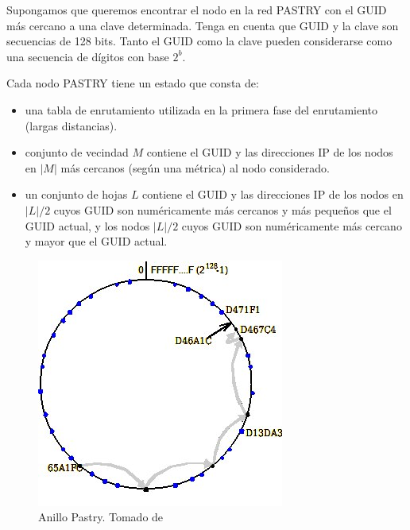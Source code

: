  Supongamos que queremos encontrar el nodo en la red PASTRY con el GUID más cercano a una clave determinada. Tenga en cuenta que GUID y la clave son secuencias de 128 bits. Tanto el GUID como la clave pueden considerarse como una secuencia de dígitos con base $2^{b}$.


Cada nodo PASTRY tiene un estado que consta de:
\begin{itemize}
	\item una tabla de enrutamiento utilizada en la primera fase del enrutamiento (largas distancias).
	\item conjunto de vecindad $M$ contiene el GUID y las direcciones IP de los nodos en  $|M|$ más cercanos (según una métrica) al nodo considerado. 
	\item un conjunto de hojas $L$ contiene el GUID y las direcciones IP de los nodos en  $|L|/2$ cuyos GUID son numéricamente más cercanos y más pequeños que el GUID actual, y los nodos $|L|/2$ cuyos GUID son numéricamente más cercano y mayor que el GUID actual.
\end{itemize}  



	\begin{figure}%
				\begin{center}
 		\includegraphics[width=0.8\linewidth] {10/pastry-et} 
		\caption{Anillo Pastry. Tomado de \cite{Coulouris2011}}
		\label{fig:pastry}
				\end{center}
\end{figure}
 
